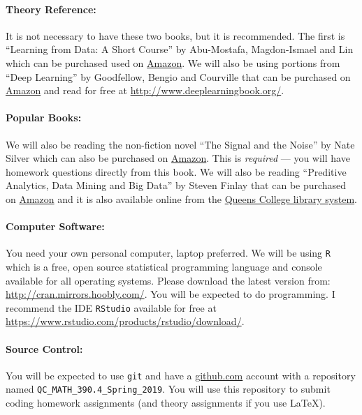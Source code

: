 \documentclass[12pt]{article}
\newcommand{\qu}[1]{``#1''}
\begin{document}
\paragraph{Theory Reference:} It is not necessary to have these two books, but it is recommended. The first is \qu{Learning from Data: A Short Course} by Abu-Mostafa, Magdon-Ismael and Lin which can be purchased used on \href{https://www.amazon.com/Learning-Data-Yaser-S-Abu-Mostafa/dp/1600490069}{Amazon}. We will also be using portions from \qu{Deep Learning} by Goodfellow, Bengio and Courville that can be purchased on \href{https://www.amazon.com/Deep-Learning-Adaptive-Computation-Machine/dp/0262035618}{Amazon} and read for free at \url{http://www.deeplearningbook.org/}.

\paragraph{Popular Books:} We will also be reading the non-fiction novel \qu{The Signal and the Noise} by Nate Silver which can also be purchased on \href{https://www.amazon.com/Signal-Noise-Many-Predictions-Fail-but/dp/0143125087}{Amazon}. This is \textit{required} --- you will have homework questions directly from this book. We will also be reading \qu{Preditive Analytics, Data Mining and Big Data} by Steven Finlay that can be purchased on \href{https://www.amazon.com/Predictive-Analytics-Data-Mining-Misconceptions/dp/1349478687}{Amazon} and it is also available online from the \href{https://link-springer-com.queens.ezproxy.cuny.edu/book/10.1057%2F9781137379283}{Queens College library system}. 

\paragraph{Computer Software:} You need your own personal computer, laptop preferred. We will be using \texttt{R} which is a free, open source statistical programming language and console available for all operating systems. Please download the latest version from: \url{http://cran.mirrors.hoobly.com/}. You will be expected to do programming. I recommend the IDE \texttt{RStudio} available for free at \url{https://www.rstudio.com/products/rstudio/download/}.

\paragraph{Source Control:} You will be expected to use \texttt{git} and have a \url{github.com} account with a repository named \texttt{QC\_MATH\_390.4\_Spring\_2019}. You will use this repository to submit coding homework assignments (and theory assignments if you use \LaTeX).
\end{document}
